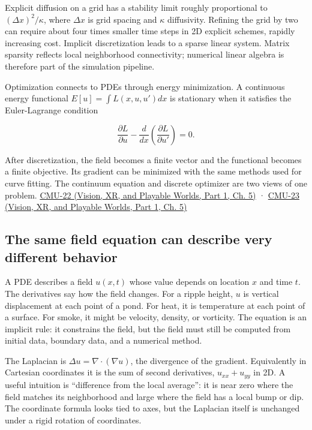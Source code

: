 Explicit diffusion on a grid has a stability limit roughly proportional to \((\Delta x)^2/\kappa\), where \(\Delta x\) is grid spacing and \(\kappa\) diffusivity. Refining the grid by two can require about four times smaller time steps in 2D explicit schemes, rapidly increasing cost. Implicit discretization leads to a sparse linear system. Matrix sparsity reflects local neighborhood connectivity; numerical linear algebra is therefore part of the simulation pipeline.

Optimization connects to PDEs through energy minimization. A continuous energy functional \(E[u]=\int L(x,u,u')dx\) is stationary when it satisfies the Euler-Lagrange condition

\[
\frac{\partial L}{\partial u}-\frac{d}{dx}\left(\frac{\partial L}{\partial u'}\right)=0.
\]

After discretization, the field becomes a finite vector and the functional becomes a finite objective. Its gradient can be minimized with the same methods used for curve fitting. The continuum equation and discrete optimizer are two views of one problem. \href{../07-Vision-XR-and-Playable-Worlds-P01/main.pdf\#nameddest=04-visual-computing-ii-ch036-cmu-22---optimization}{CMU-22 (Vision, XR, and Playable Worlds, Part 1, Ch. 5)} · \href{../07-Vision-XR-and-Playable-Worlds-P01/main.pdf\#nameddest=04-visual-computing-ii-ch036-cmu-23---physically-based-animation-and-pdes}{CMU-23 (Vision, XR, and Playable Worlds, Part 1, Ch. 5)}

\subsection{The same field equation can describe very different behavior}\label{04-visual-computing-ii-ch030-the-same-field-equation-can-describe-very-different-behavior}

\hypertarget{04-visual-computing-ii-ch030-the-same-field-equation-can-describe-very-different-behavior}{}

A PDE describes a field \(u(x,t)\) whose value depends on location \(x\) and time \(t\). The derivatives say how the field changes. For a ripple height, \(u\) is vertical displacement at each point of a pond. For heat, it is temperature at each point of a surface. For smoke, it might be velocity, density, or vorticity. The equation is an implicit rule: it constrains the field, but the field must still be computed from initial data, boundary data, and a numerical method.

The Laplacian is \(\Delta u=\nabla\cdot(\nabla u)\), the divergence of the gradient. Equivalently in Cartesian coordinates it is the sum of second derivatives, \(u_{xx}+u_{yy}\) in 2D. A useful intuition is ``difference from the local average'': it is near zero where the field matches its neighborhood and large where the field has a local bump or dip. The coordinate formula looks tied to axes, but the Laplacian itself is unchanged under a rigid rotation of coordinates.

